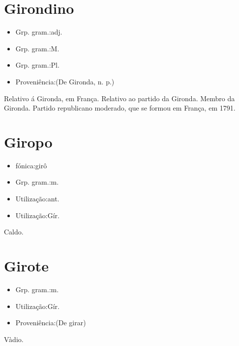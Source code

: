 \section{Girondino}
\begin{itemize}
\item {Grp. gram.:adj.}
\end{itemize}
\begin{itemize}
\item {Grp. gram.:M.}
\end{itemize}
\begin{itemize}
\item {Grp. gram.:Pl.}
\end{itemize}
\begin{itemize}
\item {Proveniência:(De \textunderscore Gironda\textunderscore , n. p.)}
\end{itemize}
Relativo á Gironda, em França.
Relativo ao partido da Gironda.
Membro da Gironda.
Partido republicano moderado, que se formou em França, em 1791.
\section{Giropo}
\begin{itemize}
\item {fónica:girô}
\end{itemize}
\begin{itemize}
\item {Grp. gram.:m.}
\end{itemize}
\begin{itemize}
\item {Utilização:ant.}
\end{itemize}
\begin{itemize}
\item {Utilização:Gír.}
\end{itemize}
Caldo.
\section{Girote}
\begin{itemize}
\item {Grp. gram.:m.}
\end{itemize}
\begin{itemize}
\item {Utilização:Gír.}
\end{itemize}
\begin{itemize}
\item {Proveniência:(De \textunderscore girar\textunderscore )}
\end{itemize}
Vàdio.
